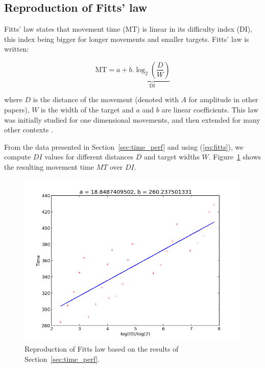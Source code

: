 \documentclass[10pt]{article}
\begin{document}
\cite{selen06b} %

\subsection{Reproduction of Fitts' law}
\label{sec:fitts}

Fitts' law states that movement time (MT) is linear in its difficulty index (DI), this index being bigger for longer movements and smaller targets. Fitts' law is written:

\begin{equation}
\text{MT} = a + b . \underbrace{\log_2\left(\frac{D}{W}\right)}_\text{DI}
\label{eq:fitts}
\end{equation}

where $D$ is the distance of the movement (denoted with $A$ for amplitude in other papers), $W$ is the width of the target and $a$ and $b$ are linear coefficients. This law was initially studied for one dimensional movements,
and then extended for many other contexts \cite{Soechting1984,Bootsma1994,Laurent1994,Plamondon1997,Smyrnis2000,Bootsma2004}.

From the data presented in Section~\ref{sec:time_perf} and using (\ref{eq:fitts}), we compute $DI$ values for different distances $D$ and target widths $W$. Figure~\ref{fig:fitts} shows the resulting movement time $MT$ over $DI$.

\begin{figure}[htp]
  \centering
\includegraphics[width=.9\columnwidth]{images/fitts}
  \caption{Reproduction of Fitts law based on the results of Section~\ref{sec:time_perf}.
\label{fig:fitts}}
\end{figure}
\end{document}
